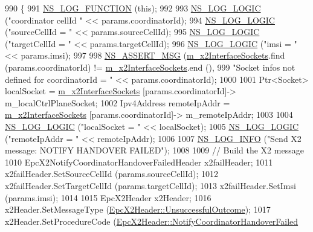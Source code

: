 \begin{DoxyCode}
990 \{
991   \hyperlink{log-macros-disabled_8h_a90b90d5bad1f39cb1b64923ea94c0761}{NS\_LOG\_FUNCTION} (\textcolor{keyword}{this});
992 
993   \hyperlink{group__logging_ga88acd260151caf2db9c0fc84997f45ce}{NS\_LOG\_LOGIC} (\textcolor{stringliteral}{"coordinator cellId "} << params.coordinatorId);
994   \hyperlink{group__logging_ga88acd260151caf2db9c0fc84997f45ce}{NS\_LOG\_LOGIC} (\textcolor{stringliteral}{"sourceCellId = "} << params.sourceCellId);
995   \hyperlink{group__logging_ga88acd260151caf2db9c0fc84997f45ce}{NS\_LOG\_LOGIC} (\textcolor{stringliteral}{"targetCellId = "} << params.targetCellId);
996   \hyperlink{group__logging_ga88acd260151caf2db9c0fc84997f45ce}{NS\_LOG\_LOGIC} (\textcolor{stringliteral}{"imsi = "} << params.imsi);
997 
998   \hyperlink{assert_8h_aff5ece9066c74e681e74999856f08539}{NS\_ASSERT\_MSG} (\hyperlink{classns3_1_1EpcX2_a0665276228b9b99a52ef6d5e9bdb306d}{m\_x2InterfaceSockets}.find (params.coordinatorId) != 
      \hyperlink{classns3_1_1EpcX2_a0665276228b9b99a52ef6d5e9bdb306d}{m\_x2InterfaceSockets}.end (),
999                  \textcolor{stringliteral}{"Socket infos not defined for coordinatorId = "} << params.coordinatorId);
1000 
1001   Ptr<Socket> localSocket = \hyperlink{classns3_1_1EpcX2_a0665276228b9b99a52ef6d5e9bdb306d}{m\_x2InterfaceSockets} [params.coordinatorId]->
      m\_localCtrlPlaneSocket;
1002   Ipv4Address remoteIpAddr = \hyperlink{classns3_1_1EpcX2_a0665276228b9b99a52ef6d5e9bdb306d}{m\_x2InterfaceSockets} [params.coordinatorId]->
      m\_remoteIpAddr;
1003 
1004   \hyperlink{group__logging_ga88acd260151caf2db9c0fc84997f45ce}{NS\_LOG\_LOGIC} (\textcolor{stringliteral}{"localSocket = "} << localSocket);
1005   \hyperlink{group__logging_ga88acd260151caf2db9c0fc84997f45ce}{NS\_LOG\_LOGIC} (\textcolor{stringliteral}{"remoteIpAddr = "} << remoteIpAddr);
1006 
1007   \hyperlink{group__logging_gafbd73ee2cf9f26b319f49086d8e860fb}{NS\_LOG\_INFO} (\textcolor{stringliteral}{"Send X2 message: NOTIFY HANDOVER FAILED"});
1008 
1009   \textcolor{comment}{// Build the X2 message}
1010   EpcX2NotifyCoordinatorHandoverFailedHeader x2failHeader;
1011   x2failHeader.SetSourceCellId (params.sourceCellId);
1012   x2failHeader.SetTargetCellId (params.targetCellId);
1013   x2failHeader.SetImsi (params.imsi);
1014 
1015   EpcX2Header x2Header;
1016   x2Header.SetMessageType (\hyperlink{classns3_1_1EpcX2Header_a0e69b043a20eaee4c570f223f4eca715a32ae3f1f4f837ceb0b22d29a5acedaf5}{EpcX2Header::UnsuccessfulOutcome});
1017   x2Header.SetProcedureCode (\hyperlink{classns3_1_1EpcX2Header_afd178c1ed3c47948c587955698a15b0da92595dd83185f3f46f1ec3172b19148b}{EpcX2Header::NotifyCoordinatorHandoverFailed}

\end{DoxyCode}

